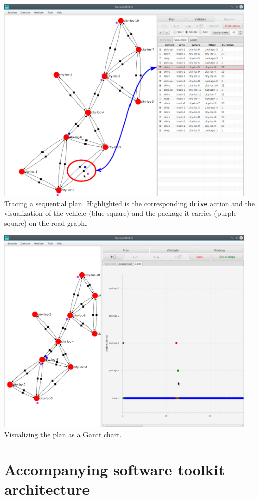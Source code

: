 \begin{center}
\includegraphics[width=0.94\textwidth]{../img/transporteditor_planstates}
Tracing a sequential plan. Highlighted is the corresponding \verb+drive+ action and the visualization of the vehicle (blue square) and the package it carries (purple square) on the road graph.
\end{center}
\medskip

\begin{center}
\includegraphics[width=0.94\textwidth]{../img/transporteditor_gantt}
Visualizing the plan as a Gantt chart.
\end{center}

\newpage

\section*{Accompanying software toolkit architecture}\label{transport-project}

